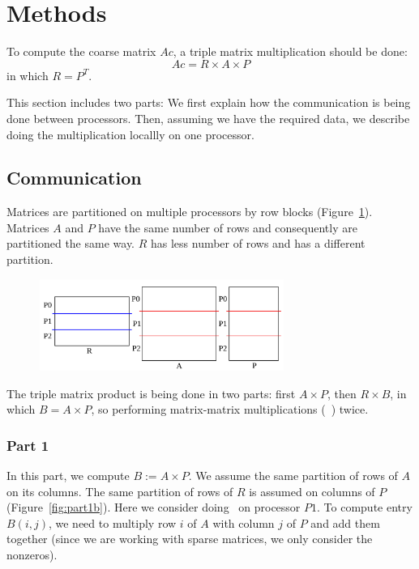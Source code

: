 \section{Methods}
\label{sec:methods}

To compute the coarse matrix $Ac$, a triple matrix multiplication should be done:
\begin{equation}
 Ac = R \times A \times P
\end{equation}
in which $R = P^T$.

This section includes two parts: We first explain how the communication is being done between processors. Then, assuming we have the required data, we describe doing the multiplication locallly on one processor.

\subsection{Communication}
\label{sec:comm}

Matrices are partitioned on multiple processors by row blocks (Figure~\ref{fig:partition}). Matrices $A$ and $P$ have the same number of rows and consequently are partitioned the same way. $R$ has less number of rows and has a different partition.

\begin{figure}[tbh]
 \centering
 \includegraphics[width=8cm,height=3cm]{./figures/partition.pdf}
 \caption{}
 \label{fig:partition}
\end{figure}

The triple matrix product is being done in two parts: first $A \times P$, then $R \times B$, in which $B = A \times P$, so performing matrix-matrix multiplications (\mm~) twice.

\subsubsection{Part 1}

In this part, we compute $B := A \times P$. We assume the same partition of rows of $A$ on its columns. The same partition of rows of $R$ is assumed on columns of $P$ (Figure~\ref{fig:part1b}).
Here we consider doing \mm ~on processor $P1$. To compute entry $B(i, j)$, we need to multiply row $i$ of $A$ with column $j$ of $P$ and add them together (since we are working with sparse matrices, we only consider the nonzeros).

